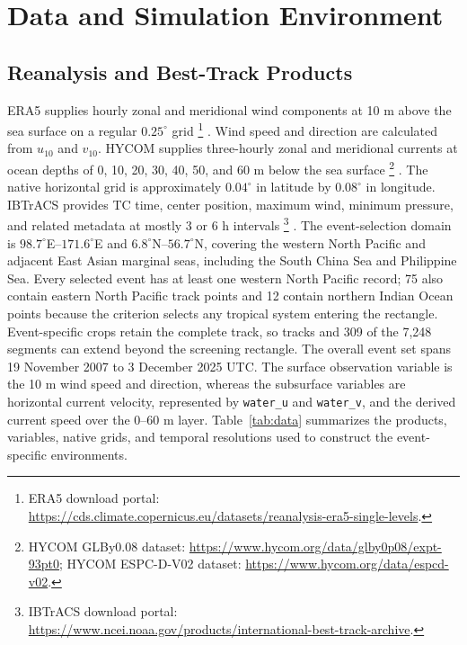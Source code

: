 \documentclass[a4paper,fleqn]{cas-dc}
\begin{document}
\section{Data and Simulation Environment}\label{sec:data}

\subsection{Reanalysis and Best-Track Products}

ERA5 supplies hourly zonal and meridional wind components at 10 m above the sea
surface on a regular $0.25^\circ$ grid
\footnote{ERA5 download portal:
\url{https://cds.climate.copernicus.eu/datasets/reanalysis-era5-single-levels}.}
\citep{r37}. Wind speed and direction are calculated from
$u_{10}$ and $v_{10}$. HYCOM supplies three-hourly zonal and meridional
currents at ocean depths of 0, 10, 20, 30, 40, 50, and 60 m below the sea
surface
\footnote{HYCOM GLBy0.08 dataset:
\url{https://www.hycom.org/data/glby0p08/expt-93pt0}; HYCOM ESPC-D-V02 dataset:
\url{https://www.hycom.org/data/espcd-v02}.}
\citep{r38}. The native horizontal grid is
approximately $0.04^\circ$ in latitude by $0.08^\circ$ in longitude. IBTrACS
provides TC time, center position, maximum wind, minimum pressure, and related
metadata at mostly 3 or 6 h intervals
\footnote{IBTrACS download portal:
\url{https://www.ncei.noaa.gov/products/international-best-track-archive}.}
\citep{r39}. The event-selection domain is
$98.7^\circ$E--$171.6^\circ$E and $6.8^\circ$N--$56.7^\circ$N, covering the
western North Pacific and adjacent East Asian marginal seas, including the
South China Sea and Philippine Sea. Every selected event has at least one
western North Pacific record; 75 also contain eastern North Pacific track
points and 12 contain northern Indian Ocean points because the criterion
selects any tropical system entering the rectangle. Event-specific crops
retain the complete track, so tracks and 309 of the 7,248 segments can extend
beyond the screening rectangle. The overall event set spans 19 November 2007
to 3 December 2025 UTC. The surface observation variable is the 10 m wind
speed and direction, whereas the subsurface variables are horizontal current
velocity, represented by \texttt{water\_u} and \texttt{water\_v}, and the
derived current speed over the 0--60 m layer.
Table~\ref{tab:data} summarizes the products, variables, native grids, and
temporal resolutions used to construct the event-specific environments.
\end{document}
